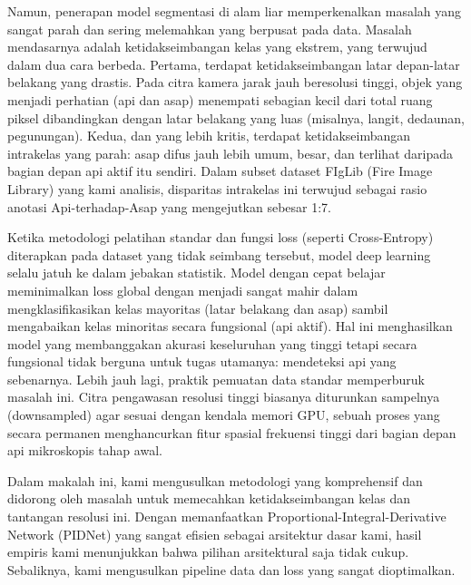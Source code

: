 \documentclass[conference]{IEEEtran}
\begin{document}
Namun, penerapan model segmentasi di alam liar memperkenalkan masalah yang sangat parah dan sering melemahkan yang berpusat pada data. Masalah mendasarnya adalah ketidakseimbangan kelas yang ekstrem, yang terwujud dalam dua cara berbeda. Pertama, terdapat ketidakseimbangan latar depan-latar belakang yang drastis. Pada citra kamera jarak jauh beresolusi tinggi, objek yang menjadi perhatian (api dan asap) menempati sebagian kecil dari total ruang piksel dibandingkan dengan latar belakang yang luas (misalnya, langit, dedaunan, pegunungan). Kedua, dan yang lebih kritis, terdapat ketidakseimbangan intrakelas yang parah: asap difus jauh lebih umum, besar, dan terlihat daripada bagian depan api aktif itu sendiri. Dalam subset dataset FIgLib (Fire Image Library) yang kami analisis, disparitas intrakelas ini terwujud sebagai rasio anotasi Api-terhadap-Asap yang mengejutkan sebesar 1:7.

Ketika metodologi pelatihan standar dan fungsi loss (seperti Cross-Entropy) diterapkan pada dataset yang tidak seimbang tersebut, model deep learning selalu jatuh ke dalam jebakan statistik. Model dengan cepat belajar meminimalkan loss global dengan menjadi sangat mahir dalam mengklasifikasikan kelas mayoritas (latar belakang dan asap) sambil mengabaikan kelas minoritas secara fungsional (api aktif). Hal ini menghasilkan model yang membanggakan akurasi keseluruhan yang tinggi tetapi secara fungsional tidak berguna untuk tugas utamanya: mendeteksi api yang sebenarnya. Lebih jauh lagi, praktik pemuatan data standar memperburuk masalah ini. Citra pengawasan resolusi tinggi biasanya diturunkan sampelnya (downsampled) agar sesuai dengan kendala memori GPU, sebuah proses yang secara permanen menghancurkan fitur spasial frekuensi tinggi dari bagian depan api mikroskopis tahap awal.

Dalam makalah ini, kami mengusulkan metodologi yang komprehensif dan didorong oleh masalah untuk memecahkan ketidakseimbangan kelas dan tantangan resolusi ini. Dengan memanfaatkan Proportional-Integral-Derivative Network (PIDNet) \cite{pidnet} yang sangat efisien sebagai arsitektur dasar kami, hasil empiris kami menunjukkan bahwa pilihan arsitektural saja tidak cukup. Sebaliknya, kami mengusulkan pipeline data dan loss yang sangat dioptimalkan.
\end{document}
